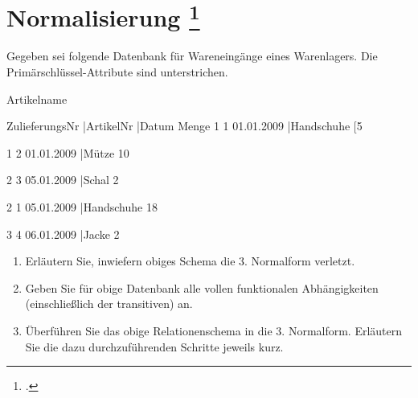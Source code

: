 \documentclass{lehramt-informatik-aufgabe}
\begin{document}
\section{Normalisierung
\footcite{examen:66116:2012:03}
}

Gegeben sei folgende Datenbank für Wareneingänge eines Warenlagers. Die
Primärschlüssel-Attribute sind unterstrichen.

Artikelname

ZulieferungsNr |ArtikelNr |Datum Menge
1 1 01.01.2009 |Handschuhe [5

1 2 01.01.2009 |Mütze 10

2 3 05.01.2009 |Schal 2

2 1 05.01.2009 |Handschuhe 18

3 4 06.01.2009 |Jacke 2

\begin{enumerate}


\item Erläutern Sie, inwiefern obiges Schema die 3. Normalform verletzt.


\item Geben Sie für obige Datenbank alle vollen funktionalen
Abhängigkeiten (einschließlich der transitiven) an.


\item Überführen Sie das obige Relationenschema in die 3. Normalform.
Erläutern Sie die dazu durchzuführenden Schritte jeweils kurz.

\end{enumerate}
\end{document}
